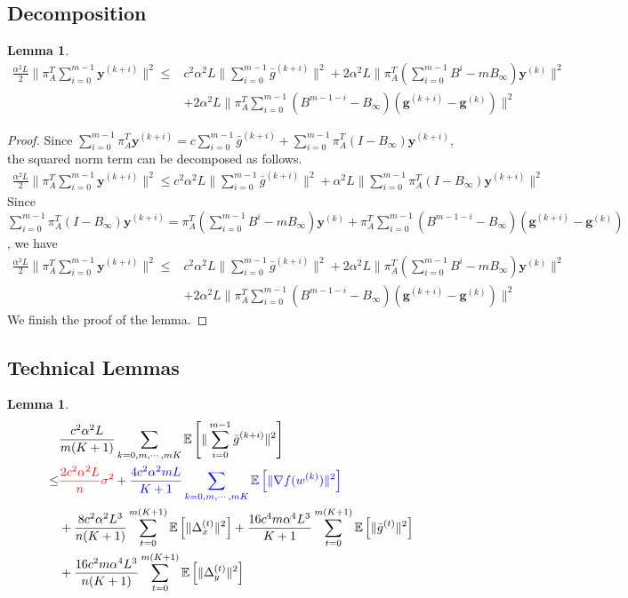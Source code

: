 \documentclass{article}
\newtheorem{lemma}[thm]{Lemma}
\newcommand{\vg}{{\mathbf{g}}}
\newcommand{\vy}{{\mathbf{y}}}
\newcommand{\EE}[1]{\mathbb{E}\left[#1\right]}
\newcommand{\norm}[1]{\| #1 \|}
\begin{document}
\subsection{Decomposition}
\begin{lemma}
  \begin{align*}
    \frac{\alpha^2L}{2}\norm{\pi_{A}^T\sum_{i=0}^{m-1}\vy^{(k+i)}}^2\leq &c^2\alpha^2L\norm{\sum_{i=0}^{m-1}\bar{g}^{(k+i)}}^2+2\alpha^2L\norm{\pi_A^T(\sum_{i=0}^{m-1}B^i - m B_{\infty})\vy^{(k)}}^2\\&+2\alpha^2L\norm{\pi_A^{T}\sum_{i=0}^{m-1}(B^{m-1-i}-B_{\infty})(\vg^{(k+i)}-\vg^{(k)})}^2
  \end{align*}
\end{lemma}
\begin{proof}
  Since $\sum_{i=0}^{m-1}\pi_{A}^T\vy^{(k+i)}=c\sum_{i=0}^{m-1}\bar{g}^{(k+i)}+\sum_{i=0}^{m-1}\pi_A^{T}(I-B_{\infty})\vy^{(k+i)}$, the squared norm term can be decomposed as follows.
\begin{align*}
  \frac{\alpha^2L}{2}\norm{\pi_{A}^T\sum_{i=0}^{m-1}\vy^{(k+i)}}^2 \leq c^2\alpha^2L\norm{\sum_{i=0}^{m-1}\bar{g}^{(k+i)}}^2+\alpha^2L\norm{\sum_{i=0}^{m-1}\pi_A^{T}(I-B_{\infty})\vy^{(k+i)}}^2
\end{align*}
Since $\sum_{i=0}^{m-1}\pi_A^{T}(I-B_{\infty})\vy^{(k+i)}=\pi_A^T(\sum_{i=0}^{m-1}B^i - m B_{\infty})\vy^{(k)}+\pi_A^{T}\sum_{i=0}^{m-1}(B^{m-1-i}-B_{\infty})(\vg^{(k+i)}-\vg^{(k)})$, we have
\begin{align*}
  \frac{\alpha^2L}{2}\norm{\pi_{A}^T\sum_{i=0}^{m-1}\vy^{(k+i)}}^2\leq &c^2\alpha^2L\norm{\sum_{i=0}^{m-1}\bar{g}^{(k+i)}}^2+2\alpha^2L\norm{\pi_A^T(\sum_{i=0}^{m-1}B^i - m B_{\infty})\vy^{(k)}}^2\\&+2\alpha^2L\norm{\pi_A^{T}\sum_{i=0}^{m-1}(B^{m-1-i}-B_{\infty})(\vg^{(k+i)}-\vg^{(k)})}^2
\end{align*}
We finish the proof of the lemma.
\end{proof}

\subsection{Technical Lemmas}
\begin{lemma}
  \begin{align*}
    &\frac{c^2\alpha^2L}{m(K+1)}\sum_{k=0,m,\cdots,mK}\EE{\norm{\sum_{i=0}^{m-1}\bar{g}^{(k+i)}}^2}
  \\ \leq& \textcolor{red}{ \frac{2c^2\alpha^2L}{n}\sigma^2}+ \textcolor{blue}{\frac{4c^2\alpha^2mL}{K+1}\sum_{k=0,m,\cdots,mK}\EE{\norm{\nabla f(w^{(k)})}^2}}\\&+\frac{8c^2\alpha^2L^3}{n(K+1)}\sum_{t=0}^{m(K+1)}\EE{\norm{\Delta_x^{(t)}}^2}+\frac{16c^4m\alpha^4L^3}{K+1}\sum_{t=0}^{m(K+1)}\EE{\norm{\bar{g}^{(t)}}^2}\\&+\frac{16c^2m\alpha^4L^3}{n(K+1)}\sum_{t=0}^{m(K+1)}\EE{\norm{\Delta_y^{(t)}}^2}
  \end{align*}
\end{lemma}
\end{document}
